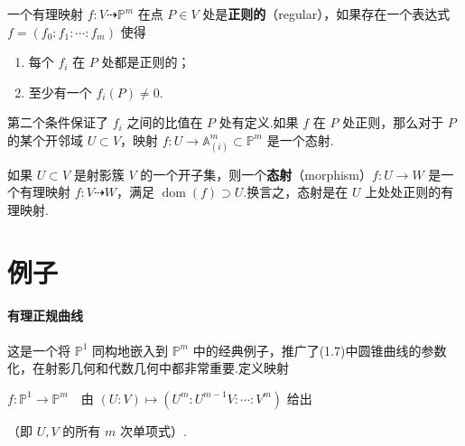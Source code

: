\begin{definition}
一个有理映射 \(f : V \dashrightarrow {\mathbb{P}}^m\) 在点 \(P \in V\) 处是\textbf{正则的}（regular），如果存在一个表达式 \(f = (f_0 : f_1 : \cdots : f_m)\) 使得
\begin{enumerate}
    \item[\upshape (i)] 每个 \(f_i\) 在 \(P\) 处都是正则的；
    \item[\upshape (ii)] 至少有一个 \(f_i(P) \neq 0\).
\end{enumerate}
\end{definition}
第二个条件保证了 \(f_i\) 之间的比值在 \(P\) 处有定义.如果 \(f\) 在 \(P\) 处正则，那么对于 \(P\) 的某个开邻域 \(U \subset V\)，映射 \(f: U \to {\mathbb{A}}_{(i)}^m \subset {\mathbb{P}}^m\) 是一个态射.

如果 \(U \subset V\) 是射影簇 \(V\) 的一个开子集，则一个\textbf{态射}（morphism）\(f : U \to W\) 是一个有理映射 \(f : V \dashrightarrow W\)，满足 \(\operatorname{dom}(f) \supset U\).换言之，态射是在 \(U\) 上处处正则的有理映射.

\section{例子}

\paragraph{有理正规曲线} 这是一个将 \({\mathbb{P}}^1\) 同构地嵌入到 \({\mathbb{P}}^m\) 中的经典例子，推广了(1.7)中圆锥曲线的参数化，在射影几何和代数几何中都非常重要.定义映射

\(
f : {\mathbb{P}}^1 \to {\mathbb{P}}^m \quad \text{由 } (U:V) \mapsto (U^m : U^{m-1}V : \cdots : V^m) \text{ 给出}
\)

（即 \(U,V\) 的所有 \(m\) 次单项式）.

